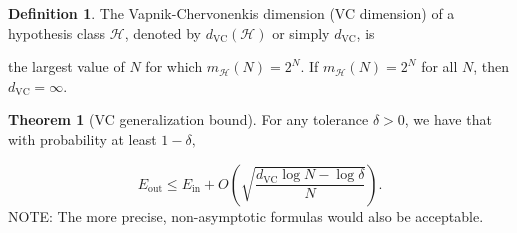 \documentclass[10pt]{exam}
\theoremstyle{definition}
\newtheorem{defn}{Definition}
\newtheorem{theorem}{Theorem}
\newcommand{\E}{\mathbb E}
\DeclareMathOperator{\prob}{\mathbb P}
\newcommand{\Ein}{E_{\text{in}}}
\newcommand{\Eout}{E_{\text{out}}}
\newcommand{\mH}{m_{\mathcal H}}
\newcommand{\dvc}{{d_{\text{VC}}}}
\newcommand{\ignore}[1]{}
\begin{document}
\ignore{
\begin{theorem}[Hoeffding Inequality]
    Let $a_1, ..., a_N$ be $N$ independent and identically distributed random variables satisfying $0 \le a_i \le 1$.
    Let $\nu = \tfrac1n\sum_{i=1}^N a_i$ be the empirical average and $\mu = \E \nu$ be the true mean of the underlying distribution.
    Then, for all $\epsilon > 0$,
    \begin{solutionorbox}[1in]
    \begin{equation*}
        \label{eq:hoef}
        \prob\big(|\nu - \mu| \ge \epsilon\big)
        \le 
        2 \exp (-2\epsilon^2 N)
        .
    \end{equation*}
    \end{solutionorbox}
\end{theorem}

\begin{theorem}[Finite Hypothesis Class Generalization]
    Let $\mathcal H$ be a hypothesis class of size $M$,
    let $g$ be an arbitrary hypothesis in $\mathcal H$
    (in particular, $g$ is allowed to be the result of the TEA algorithm),
    and let $N$ be the size of the dataset.
    Then we have that for all $\epsilon>0$,
    \begin{equation*}
    \prob[|\Ein(g) - \Eout(g)| \ge \epsilon] \le 2M\exp(-2\epsilon^2 N).
    \end{equation*}
    This implies that with probability at least $1-\delta$,
    \begin{equation*}
        \Eout(g) \le \Ein(g) + \sqrt{\frac{1}{2N} \log\frac{2M}{\delta}}.
    \end{equation*}
\end{theorem}
}

\begin{defn}
    The Vapnik-Chervonenkis dimension (VC dimension) of a hypothesis class $\mathcal H$, denoted by $\dvc(\mathcal H)$ or simply $\dvc$, is 
    \begin{solutionorbox}[1in]
        the largest value of $N$ for which $\mH(N) = 2^N$.
        If $\mH(N) = 2^N$ for all $N$, then $\dvc = \infty$.
    \end{solutionorbox}
\end{defn}

\begin{theorem}[VC generalization bound]
    For any tolerance $\delta>0$, we have that with probability at least $1-\delta,$
    \begin{solutionorbox}[1in]
    \begin{equation*}
        \Eout 
         \le
         \Ein
         +
         O\left(\sqrt{\frac{\dvc\log N - \log\delta}{N}}\right).
    \end{equation*}
        NOTE: The more precise, non-asymptotic formulas would also be acceptable.
    \end{solutionorbox}

\end{theorem}
\end{document}
